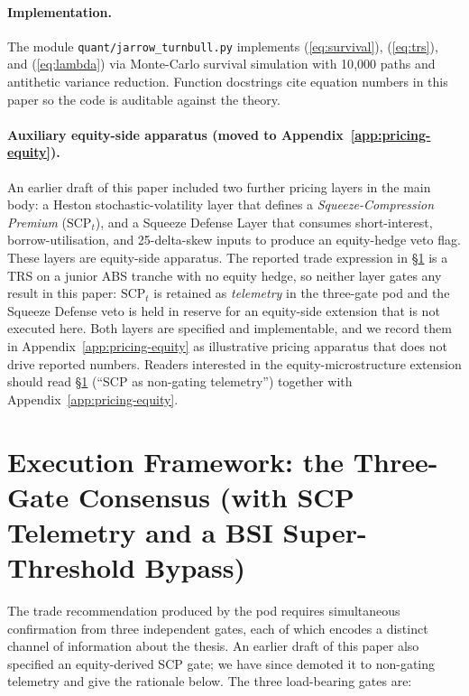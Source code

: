 \documentclass[11pt,letterpaper]{article}
\newcommand{\scp}{\text{SCP}}
\begin{document}
\paragraph{Implementation.}
The module \texttt{quant/jarrow\_turnbull.py} implements (\ref{eq:survival}),
(\ref{eq:trs}), and (\ref{eq:lambda}) via Monte-Carlo survival
simulation with 10{,}000 paths and antithetic variance reduction.
Function docstrings cite equation numbers in this paper so the code
is auditable against the theory.

\paragraph{Auxiliary equity-side apparatus (moved to
Appendix~\ref{app:pricing-equity}).}
An earlier draft of this paper included two further pricing layers in
the main body: a Heston stochastic-volatility layer that defines a
\emph{Squeeze-Compression Premium} ($\scp_t$), and a Squeeze Defense
Layer that consumes short-interest, borrow-utilisation, and
25-delta-skew inputs to produce an equity-hedge veto flag. These
layers are equity-side apparatus. The reported trade expression in
\S\ref{sec:exec} is a TRS on a junior ABS tranche with no equity
hedge, so neither layer gates any result in this paper: $\scp_t$ is
retained as \emph{telemetry} in the three-gate pod and the
Squeeze Defense veto is held in reserve for an equity-side
extension that is not executed here. Both layers are specified and
implementable, and we record them in
Appendix~\ref{app:pricing-equity} as illustrative pricing apparatus
that does not drive reported numbers. Readers interested in the
equity-microstructure extension should read \S\ref{sec:exec}
(``SCP as non-gating telemetry'') together with
Appendix~\ref{app:pricing-equity}.


\section{Execution Framework: the Three-Gate Consensus (with SCP
Telemetry and a BSI Super-Threshold Bypass)}
\label{sec:exec}

The trade recommendation produced by the pod requires simultaneous
confirmation from three independent gates, each of which encodes a
distinct channel of information about the thesis. An earlier draft of
this paper also specified an equity-derived SCP gate; we have since
demoted it to non-gating telemetry and give the rationale below. The
three load-bearing gates are:
\end{document}
